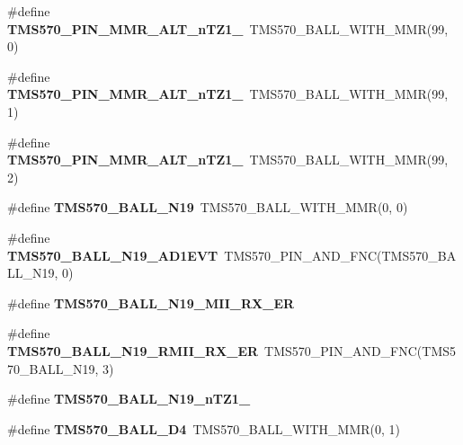 \begin{DoxyCompactItemize}
\item 
\mbox{\label{tms570lc4357-pins_8h_a6e479c165fcac3a5800c26c1e8b9a3c9}} 
\#define {\bfseries T\+M\+S570\+\_\+\+P\+I\+N\+\_\+\+M\+M\+R\+\_\+\+A\+L\+T\+\_\+n\+T\+Z1\+\_}~T\+M\+S570\+\_\+\+B\+A\+L\+L\+\_\+\+W\+I\+T\+H\+\_\+\+M\+MR(99, 0)
\item 
\mbox{\label{tms570lc4357-pins_8h_aa5ceaafffb25f6de08eb9f95d3de85e6}} 
\#define {\bfseries T\+M\+S570\+\_\+\+P\+I\+N\+\_\+\+M\+M\+R\+\_\+\+A\+L\+T\+\_\+n\+T\+Z1\+\_}~T\+M\+S570\+\_\+\+B\+A\+L\+L\+\_\+\+W\+I\+T\+H\+\_\+\+M\+MR(99, 1)
\item 
\mbox{\label{tms570lc4357-pins_8h_a19496833faf71f7a955a0ad81c9e1b52}} 
\#define {\bfseries T\+M\+S570\+\_\+\+P\+I\+N\+\_\+\+M\+M\+R\+\_\+\+A\+L\+T\+\_\+n\+T\+Z1\+\_}~T\+M\+S570\+\_\+\+B\+A\+L\+L\+\_\+\+W\+I\+T\+H\+\_\+\+M\+MR(99, 2)
\item 
\mbox{\label{tms570lc4357-pins_8h_aadbe02e15a0512330eebe0fd50393980}} 
\#define {\bfseries T\+M\+S570\+\_\+\+B\+A\+L\+L\+\_\+\+N19}~T\+M\+S570\+\_\+\+B\+A\+L\+L\+\_\+\+W\+I\+T\+H\+\_\+\+M\+MR(0, 0)
\item 
\mbox{\label{tms570lc4357-pins_8h_a2135454ed5b9c5957934919c06ed57cf}} 
\#define {\bfseries T\+M\+S570\+\_\+\+B\+A\+L\+L\+\_\+\+N19\+\_\+\+A\+D1\+E\+VT}~T\+M\+S570\+\_\+\+P\+I\+N\+\_\+\+A\+N\+D\+\_\+\+F\+NC(T\+M\+S570\+\_\+\+B\+A\+L\+L\+\_\+\+N19, 0)
\item 
\#define {\bfseries T\+M\+S570\+\_\+\+B\+A\+L\+L\+\_\+\+N19\+\_\+\+M\+I\+I\+\_\+\+R\+X\+\_\+\+ER}
\item 
\mbox{\label{tms570lc4357-pins_8h_ab3a7bab9d59a176fee9ebdd888dcc0be}} 
\#define {\bfseries T\+M\+S570\+\_\+\+B\+A\+L\+L\+\_\+\+N19\+\_\+\+R\+M\+I\+I\+\_\+\+R\+X\+\_\+\+ER}~T\+M\+S570\+\_\+\+P\+I\+N\+\_\+\+A\+N\+D\+\_\+\+F\+NC(T\+M\+S570\+\_\+\+B\+A\+L\+L\+\_\+\+N19, 3)
\item 
\#define {\bfseries T\+M\+S570\+\_\+\+B\+A\+L\+L\+\_\+\+N19\+\_\+n\+T\+Z1\+\_}
\item 
\mbox{\label{tms570lc4357-pins_8h_a20a73c4871f33b38f74f0bbb3449eb2e}} 
\#define {\bfseries T\+M\+S570\+\_\+\+B\+A\+L\+L\+\_\+\+D4}~T\+M\+S570\+\_\+\+B\+A\+L\+L\+\_\+\+W\+I\+T\+H\+\_\+\+M\+MR(0, 1)

\end{DoxyCompactItemize}
